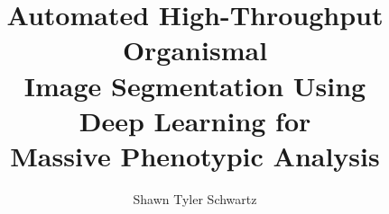\documentclass [MS] {uclathes}
\title          {Automated High-Throughput Organismal \\
                Image Segmentation Using \\
                Deep Learning for \\ Massive Phenotypic Analysis}
\author         {Shawn Tyler Schwartz}
\newcommand*\Hide{%
\titleformat{\chapter}[display]
  {}{}{0pt}{\Huge}
\titleformat{\part}
  {}{}{0pt}{}
}
\newcommand{\optional}[1]{}
\newcommand\epigraph[3]{
\vspace{1em}\hfill{}\begin{minipage}{#1}{
\small\noindent\textit{#2}
\vspace{1em}
\hfill{}{#3}}\vspace{2em}
\end{minipage}}
\newcounter{oldtocdepth}
\newcommand{\hidefromtoc}{%
  \setcounter{oldtocdepth}{\value{tocdepth}}%
  \addtocontents{toc}{\protect\setcounter{tocdepth}{-10}}%
}
\newcommand{\unhidefromtoc}{%
  \addtocontents{toc}{\protect\setcounter{tocdepth}{\value{oldtocdepth}}}%
}
\begin{document}
\makeintropages


%
%



\optional{
\chapter*{\emph{Sashimi}: A toolkit for facilitating high-throughput organismal image segmentation using deep learning}
\addcontentsline{toc}{chapter}{\emph{Sashimi}: A toolkit for facilitating high-throughput organismal image segmentation using deep learning}
}

\clearpage
\end{document}

